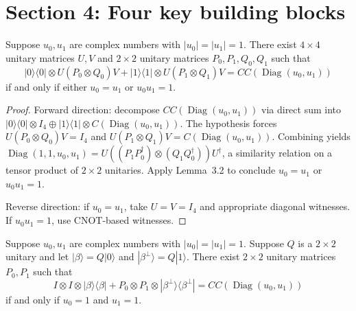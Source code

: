 \section{Section 4: Four key building blocks}

\begin{lemma}
  \label{lem:s4_1}
  \leanok
  Suppose $u_0, u_1$ are complex numbers with $|u_0| = |u_1| = 1$.
  There exist $4 \times 4$ unitary matrices $U, V$ and $2 \times 2$ unitary matrices $P_0, P_1, Q_0, Q_1$ such that
  \[
    |0\rangle\langle 0| \otimes U(P_0 \otimes Q_0)V
    + |1\rangle\langle 1| \otimes U(P_1 \otimes Q_1)V
    = CC(\operatorname{Diag}(u_0, u_1))
  \]
  if and only if either $u_0 = u_1$ or $u_0 u_1 = 1$.
\end{lemma}

\begin{proof}
  \leanok
  Forward direction: decompose $CC(\operatorname{Diag}(u_0, u_1))$ via direct sum into
  $|0\rangle\langle 0| \otimes I_4 \oplus |1\rangle\langle 1| \otimes C(\operatorname{Diag}(u_0, u_1))$.
  The hypothesis forces $U(P_0 \otimes Q_0)V = I_4$ and
  $U(P_1 \otimes Q_1)V = C(\operatorname{Diag}(u_0, u_1))$.
  Combining yields $\operatorname{Diag}(1, 1, u_0, u_1) = U((P_1 P_0^\dagger) \otimes (Q_1 Q_0^\dagger))U^\dagger$,
  a similarity relation on a tensor product of $2 \times 2$ unitaries.
  Apply Lemma~3.2 to conclude $u_0 = u_1$ or $u_0 u_1 = 1$.

  Reverse direction: if $u_0 = u_1$, take $U = V = I_4$ and appropriate diagonal witnesses.
  If $u_0 u_1 = 1$, use CNOT-based witnesses.
\end{proof}

\begin{lemma}
  \label{lem:s4_2}
  \leanok
  Suppose $u_0, u_1$ are complex numbers with $|u_0| = |u_1| = 1$.
  Suppose $Q$ is a $2 \times 2$ unitary and let $|\beta\rangle = Q|0\rangle$
  and $|\beta^\perp\rangle = Q|1\rangle$.
  There exist $2 \times 2$ unitary matrices $P_0, P_1$ such that
  \[
    I \otimes I \otimes |\beta\rangle\langle\beta|
    + P_0 \otimes P_1 \otimes |\beta^\perp\rangle\langle\beta^\perp|
    = CC(\operatorname{Diag}(u_0, u_1))
  \]
  if and only if $u_0 = 1$ and $u_1 = 1$.
\end{lemma}


